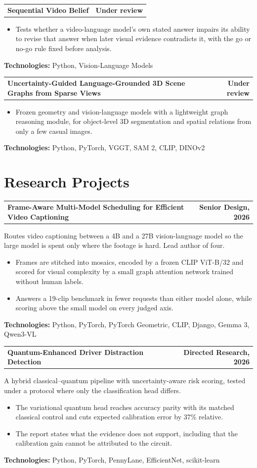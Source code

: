 \documentclass[10pt,letterpaper]{article}
\makeatletter
\newcommand{\entryhead}[2]{\par\needspace{4\baselineskip}\vspace{4pt}\noindent%
  \begin{tabular*}{\textwidth}[t]{@{}>{\raggedright\arraybackslash}p{0.72\textwidth}@{\extracolsep{\fill}}r@{}}
    \textbf{#1} & #2
  \end{tabular*}\par\vspace{1pt}}
\newcommand{\entry}[2]{\entryhead{#1}{\textbf{#2}}}
\newcommand{\tech}[1]{\par\vspace{2pt}\noindent\textbf{Technologies:} #1\par}
\newcommand{\gap}{\par\vspace{7pt}}
\let\origsection\section
\renewcommand{\section}[1]{\needspace{7\baselineskip}\origsection{#1}}
\makeatother
\begin{document}
\entry{Sequential Video Belief}{Under review}
\begin{itemize}
  \item Tests whether a video-language model's own stated answer impairs its ability to revise that
    answer when later visual evidence contradicts it, with the go or no-go rule fixed before
    analysis.
\end{itemize}
\tech{Python, Vision-Language Models}
\gap

\entry{Uncertainty-Guided Language-Grounded 3D Scene Graphs from Sparse Views}{Under review}
\begin{itemize}
  \item Frozen geometry and vision-language models with a lightweight graph reasoning module, for
    object-level 3D segmentation and spatial relations from only a few casual images.
\end{itemize}
\tech{Python, PyTorch, VGGT, SAM 2, CLIP, DINOv2}

\section{Research Projects}

\entry{Frame-Aware Multi-Model Scheduling for Efficient Video Captioning}{Senior Design, 2026}
Routes video captioning between a 4B and a 27B vision-language model so the large model is spent
only where the footage is hard. Lead author of four.
\begin{itemize}
  \item Frames are stitched into mosaics, encoded by a frozen CLIP ViT-B/32 and scored for visual
    complexity by a small graph attention network trained without human labels.
  \item Answers a 19-clip benchmark in fewer requests than either model alone, while scoring above
    the small model on every judged axis.
\end{itemize}
\tech{Python, PyTorch, PyTorch Geometric, CLIP, Django, Gemma 3, Qwen3-VL}
\gap

\entry{Quantum-Enhanced Driver Distraction Detection}{Directed Research, 2026}
A hybrid classical--quantum pipeline with uncertainty-aware risk scoring, tested under a protocol
where only the classification head differs.
\begin{itemize}
  \item The variational quantum head reaches accuracy parity with its matched classical control and
    cuts expected calibration error by 37\% relative.
  \item The report states what the evidence does not support, including that the calibration gain
    cannot be attributed to the circuit.
\end{itemize}
\tech{Python, PyTorch, PennyLane, EfficientNet, scikit-learn}
\gap
\end{document}

